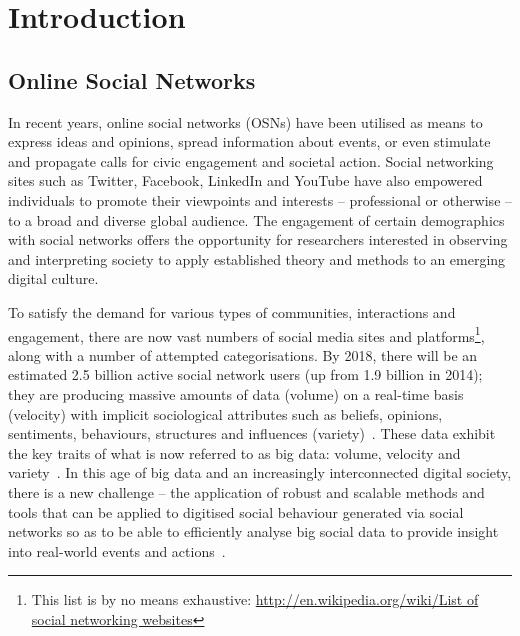 \documentclass[conference]{IEEEtran}
\begin{document}
%



\section{Introduction}\label{intro}

\subsection{Online Social Networks}
 
In recent years, online social networks (OSNs) have been utilised as
means to express ideas and opinions, spread information about events,
or even stimulate and propagate calls for civic engagement and
societal action. Social networking sites such as Twitter, Facebook,
LinkedIn and YouTube have also empowered individuals to promote their
viewpoints and interests -- professional or otherwise -- to a broad
and diverse global audience. The engagement of certain demographics
with social networks offers the opportunity for researchers interested
in observing and interpreting society to apply established theory and
methods to an emerging digital culture.

To satisfy the demand for various types of communities, interactions
and engagement, there are now vast numbers of social media sites and
platforms\footnote{This list is by no means exhaustive:
\url{http://en.wikipedia.org/wiki/List of social networking
websites}}, along with a number of attempted categorisations. By 2018,
there will be an estimated 2.5 billion active social network users (up
from 1.9 billion in 2014); they are producing massive amounts of data
(volume) on a real-time basis (velocity) with implicit sociological
attributes such as beliefs, opinions, sentiments, behaviours,
structures and influences (variety)~\cite{burnap-et-al:2015}. These
data exhibit the key traits of what is now referred to as big data:
volume, velocity and variety~\cite{postsm:2014}. In this age of big
data and an increasingly interconnected digital society, there is a
new challenge -- the application of robust and scalable methods and
tools that can be applied to digitised social behaviour generated via
social networks so as to be able to efficiently analyse big social
data to provide insight into real-world events and
actions~\cite{lazer-et-al:2009,burnap-et-al:2015}.
\end{document}

